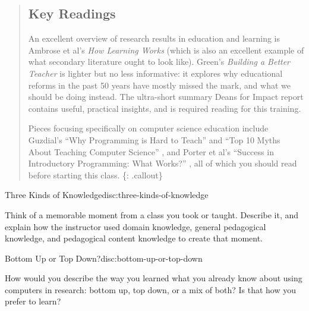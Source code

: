 \begin{quote}
\subsection{Key Readings}\label{key-readings}

An excellent overview of research results in education and learning is
Ambrose et al's
\textit{How Learning Works} \cite{bib:ambrose-hlw} (which is also an excellent example of what secondary
literature ought to look like).  Green's
\textit{Building a Better Teacher} \cite{bib:greene-babt} is lighter but no less informative: it explores why
educational reforms in the past 50 years have mostly missed the mark,
and what we should be doing instead. The ultra-short summary
Deans for Impact report \cite{bib:deans-for-impact} contains useful, practical insights, and is
required reading for this training.

Pieces focusing specifically on computer science education include
Guzdial's
``Why Programming is Hard to Teach'' \cite{bib:guzdial-hard} and
``Top 10 Myths About Teaching Computer Science'' \cite{bib:guzdial-top10},
and Porter et al's ``Success in Introductory Programming: What Works?'' \cite{bib:porter-what-works},
all of which you should read before starting this class. \{: .callout\}
\end{quote}

\begin{discussion}{Three Kinds of Knowledge}{disc:three-kinds-of-knowledge}

Think of a memorable moment from a class you took or taught. Describe
it, and explain how the instructor used domain knowledge, general
pedagogical knowledge, and pedagogical content knowledge to create that
moment.
\end{discussion}

\begin{discussion}{Bottom Up or Top Down?}{disc:bottom-up-or-top-down}

How would you describe the way you learned what you already know about
using computers in research: bottom up, top down, or a mix of both? Is
that how you prefer to learn?
\end{discussion}
